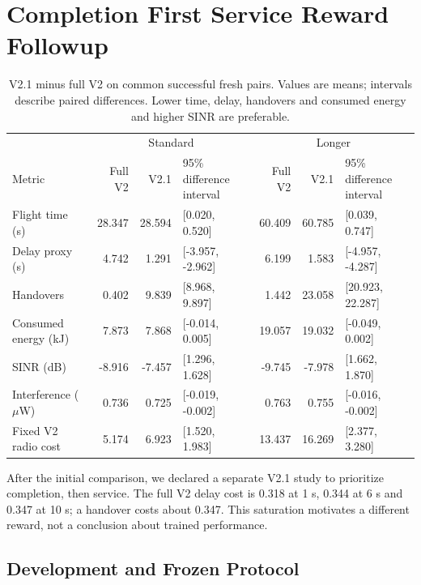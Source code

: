 \section{Completion First Service Reward Followup}

\label{sec:v21}

\begin{table}[!t]\centering\small

\caption{V2.1 minus full V2 on common successful fresh pairs. Values are means; intervals describe paired differences. Lower time, delay, handovers and consumed energy and higher SINR are preferable.}

\label{tab:v21paired}

\begin{tabular}{lrrlrrl}\toprule & \multicolumn{3}{c}{Standard} & \multicolumn{3}{c}{Longer}\\
Metric & Full V2 & V2.1 & 95\% difference interval & Full V2 & V2.1 & 95\% difference interval\\\midrule
Flight time (s) & 28.347 & 28.594 & [0.020, 0.520] & 60.409 & 60.785 & [0.039, 0.747]\\
Delay proxy (s) & 4.742 & 1.291 & [-3.957, -2.962] & 6.199 & 1.583 & [-4.957, -4.287]\\
Handovers & 0.402 & 9.839 & [8.968, 9.897] & 1.442 & 23.058 & [20.923, 22.287]\\
Consumed energy (kJ) & 7.873 & 7.868 & [-0.014, 0.005] & 19.057 & 19.032 & [-0.049, 0.002]\\
SINR (dB) & -8.916 & -7.457 & [1.296, 1.628] & -9.745 & -7.978 & [1.662, 1.870]\\
Interference ($\mu$W) & 0.736 & 0.725 & [-0.019, -0.002] & 0.763 & 0.755 & [-0.016, -0.002]\\
Fixed V2 radio cost & 5.174 & 6.923 & [1.520, 1.983] & 13.437 & 16.269 & [2.377, 3.280]\\
\bottomrule\end{tabular}\end{table}

After the initial comparison, we declared a separate V2.1 study to prioritize completion, then service. The full V2 delay cost is 0.318 at 1 s, 0.344 at 6 s and 0.347 at 10 s; a handover costs about 0.347. This saturation motivates a different reward, not a conclusion about trained performance.

\subsection{Development and Frozen Protocol}

